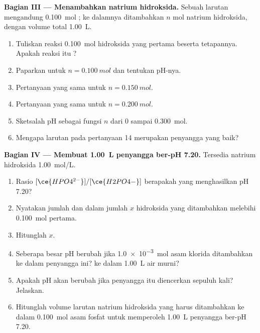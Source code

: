 \begin{problem}
\medskip
\noindent\textbf{Bagian III --- Menambahkan natrium hidroksida.}
Sebuah larutan mengandung \qty{0.100}{mol} ; ke dalamnya
ditambahkan $n$ mol natrium hidroksida, dengan volume total
\qty{1.00}{L}.
\begin{enumerate}[resume]
  \item Tuliskan reaksi \qty{0.100}{mol} hidroksida yang pertama beserta
        tetapannya. Apakah reaksi itu ?
  \item Paparkan  untuk $n = \qty{0.100}{mol}$ dan
        tentukan pH-nya.
  \item Pertanyaan yang sama untuk $n = \qty{0.150}{mol}$.
  \item Pertanyaan yang sama untuk $n = \qty{0.200}{mol}$.
  \item Sketsalah pH sebagai fungsi $n$ dari 0 sampai \qty{0.300}{mol}.
  \item Mengapa larutan pada pertanyaan 14 merupakan penyangga yang baik?
\end{enumerate}

\medskip
\noindent\textbf{Bagian IV --- Membuat \qty{1.00}{L} penyangga ber-pH 7.20.}
Tersedia natrium hidroksida \qty{1.00}{mol/L}.
\begin{enumerate}[resume]
  \item Rasio $[\ce{HPO4^{2-}}]/[\ce{H2PO4-}]$ berapakah yang menghasilkan
        pH 7.20?
  \item Nyatakan jumlah  dan  dalam jumlah $x$
        hidroksida yang ditambahkan melebihi \qty{0.100}{mol} pertama.
  \item Hitunglah $x$.
  \item Seberapa besar pH berubah jika \qty{1.0e-3}{mol} asam klorida
        ditambahkan ke dalam penyangga ini? ke dalam \qty{1.00}{L} air
        murni?
  \item Apakah pH akan berubah jika penyangga itu diencerkan sepuluh
        kali? Jelaskan.
  \item Hitunglah volume larutan natrium hidroksida yang harus
        ditambahkan ke dalam \qty{0.100}{mol} asam fosfat untuk
        memperoleh \qty{1.00}{L} penyangga ber-pH 7.20.
\end{enumerate}
\end{problem}
